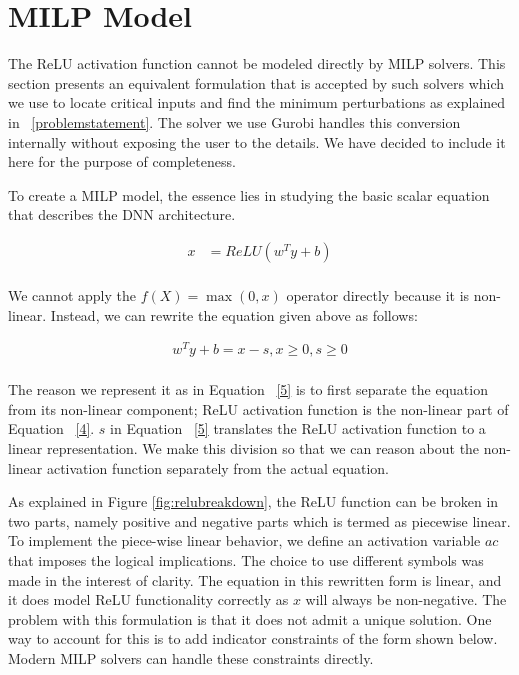 \section{MILP Model}
The ReLU activation function cannot be modeled directly by MILP solvers. 
This section presents an
equivalent formulation that is accepted by such solvers which we use to locate critical inputs and find the minimum perturbations as explained in ~\ref{problemstatement}. 
The solver we use Gurobi handles this conversion
internally without exposing the user to the details. 
We have decided to include it here for the purpose of completeness.

 
To create a \ac{MILP} model, the essence lies in studying the basic scalar equation that describes the \ac{DNN} architecture. 

\begin{equation}
\label{4}
\begin{aligned}
x &= ReLU(w^Ty + b) \\
\end{aligned}
\end{equation}
 

We cannot apply the $f(X) = \max(0, x)$ operator directly because it is non-linear. 
Instead, we can rewrite the equation given above as follows:

\begin{equation}
\label{5}
\begin{aligned}
w^Ty + b = x - s, x \geq 0, s \geq 0 \\
\end{aligned}
\end{equation}

The reason we represent it as in Equation ~\ref{5} is to first separate the equation from its non-linear component;  ReLU activation function is the non-linear part of Equation ~\ref{4}.
$s$ in Equation ~\ref{5} translates the ReLU activation function to a linear representation. 
We make this division so that we can reason about the non-linear activation function separately from the actual equation. 

As explained in Figure \ref{fig:relubreakdown}, the ReLU function can be broken in two parts, namely positive and negative parts which is termed as piecewise linear.  
To implement the piece-wise linear behavior, we define an activation variable $ac$ that imposes the logical implications. 
The choice to use different symbols was made in the interest of clarity. The equation in this rewritten form is linear, and it does model ReLU functionality  correctly as $x$ will always be non-negative. 
The problem with this formulation is that it does not admit a unique solution. One way to account for this is to add indicator constraints of the form shown below. 
Modern MILP solvers can handle these constraints directly.

